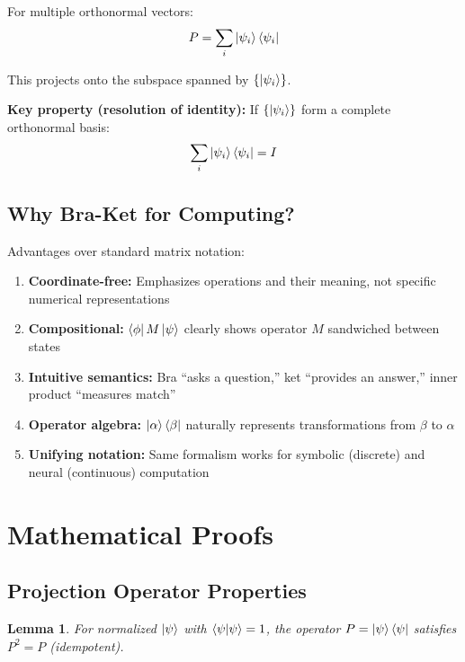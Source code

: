 \documentclass[11pt,a4paper]{article}
\newtheorem{lemma}[theorem]{Lemma}
\theoremstyle{definition}
\begin{document}
For multiple orthonormal vectors:
\begin{equation}
P = \sum_i \ket{\psi_i}\bra{\psi_i}
\end{equation}

This projects onto the subspace spanned by $\{\ket{\psi_i}\}$.

\textbf{Key property (resolution of identity):} If $\{\ket{\psi_i}\}$ form a complete orthonormal basis:
\begin{equation}
\sum_i \ket{\psi_i}\bra{\psi_i} = I
\end{equation}

\subsection{Why Bra-Ket for Computing?}

Advantages over standard matrix notation:

\begin{enumerate}
\item \textbf{Coordinate-free:} Emphasizes operations and their meaning, not specific numerical representations
\item \textbf{Compositional:} $\bra{\phi}M\ket{\psi}$ clearly shows operator $M$ sandwiched between states
\item \textbf{Intuitive semantics:} Bra ``asks a question,'' ket ``provides an answer,'' inner product ``measures match''
\item \textbf{Operator algebra:} $\ket{\alpha}\bra{\beta}$ naturally represents transformations from $\beta$ to $\alpha$
\item \textbf{Unifying notation:} Same formalism works for symbolic (discrete) and neural (continuous) computation
\end{enumerate}

\section{Mathematical Proofs}

\subsection{Projection Operator Properties}

\begin{lemma}
For normalized $\ket{\psi}$ with $\braket{\psi|\psi} = 1$, the operator $P = \ket{\psi}\bra{\psi}$ satisfies $P^2 = P$ (idempotent).
\end{lemma}
\end{document}
